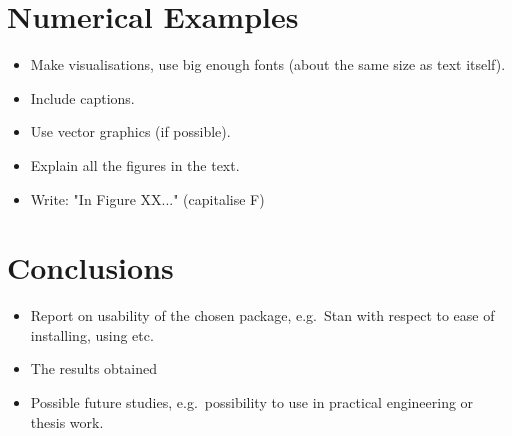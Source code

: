 \documentclass[times, a4paper, 12pt, onecolumn, oneside]{article}
\begin{document}
\section{Numerical Examples}

\begin{itemize}
    \item Make visualisations, use big enough fonts (about the same size as text itself).
    \item Include captions.
    \item Use vector graphics (if possible).
    \item Explain all the figures in the text.
    \item Write: "In Figure XX..." (capitalise F)
\end{itemize}

\section{Conclusions}

\begin{itemize}
    \item Report on usability of the chosen package, e.g.\ Stan with respect to ease of installing, using etc.
    \item The results obtained
    \item Possible future studies, e.g.\ possibility to use in practical engineering or thesis work.
\end{itemize}


\end{document}
